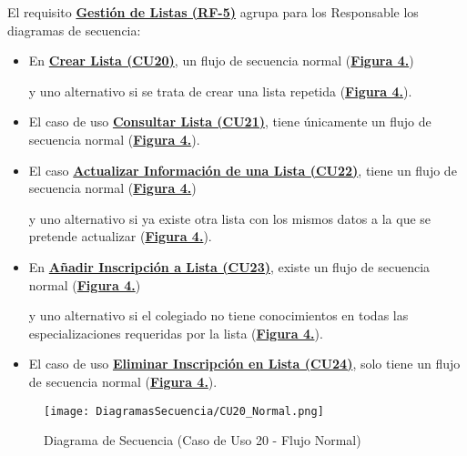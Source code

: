 El requisito \textbf{\hyperref[tab:rfGestLst]{Gestión de Listas (RF-5)}} agrupa para los Responsable los diagramas de secuencia:
\begin{itemize}
  \item \addtocounter{figura_cap4}{1} En \textbf{\hyperref[tab:curCrearLista]{Crear Lista (CU20)}}, un flujo de secuencia normal (\textbf{\hyperref[fig:Secuencia_CU20_Normal]{Figura 4.}}) \addtocounter{figura_cap4}{1} y uno alternativo si se trata de crear una lista repetida (\textbf{\hyperref[fig:Secuencia_CU20_Alt1]{Figura 4.}}).
  \item \addtocounter{figura_cap4}{1} El caso de uso \textbf{\hyperref[tab:curConsultarLista]{Consultar Lista (CU21)}}, tiene únicamente un flujo de secuencia normal (\textbf{\hyperref[fig:Secuencia_CU21_Normal]{Figura 4.}}).
  \item \addtocounter{figura_cap4}{1} El caso \textbf{\hyperref[tab:curActualizarLista]{Actualizar Información de una Lista (CU22)}}, tiene un flujo de secuencia normal (\textbf{\hyperref[fig:Secuencia_CU22_Normal]{Figura 4.}}) \addtocounter{figura_cap4}{1} y uno alternativo si ya existe otra lista con los mismos datos a la que se pretende actualizar (\textbf{\hyperref[fig:Secuencia_CU22_Alt1]{Figura 4.}}).
  \item \addtocounter{figura_cap4}{1} En \textbf{\hyperref[tab:curCrearInscrLst]{Añadir Inscripción a Lista (CU23)}}, existe un flujo de secuencia normal (\textbf{\hyperref[fig:Secuencia_CU23_Normal]{Figura 4.}}) \addtocounter{figura_cap4}{1} y uno alternativo si el colegiado no tiene conocimientos en todas las especializaciones requeridas por la lista (\textbf{\hyperref[fig:Secuencia_CU23_Alt1]{Figura 4.}}).
  \item \addtocounter{figura_cap4}{1} El caso de uso \textbf{\hyperref[tab:curEliminarInscrLst]{Eliminar Inscripción en Lista (CU24)}}, solo tiene un flujo de secuencia normal (\textbf{\hyperref[fig:Secuencia_CU24_Normal]{Figura 4.}}).
\end{itemize}

\begin{landscape}
  \begin{figure}[!htbp]
    \centering
    \texttt{[image: DiagramasSecuencia/CU20\_Normal.png]}
    \caption{Diagrama de Secuencia (Caso de Uso 20 - Flujo Normal)}
    \label{fig:Secuencia_CU20_Normal}
  \end{figure}
\end{landscape}
\FloatBarrier

